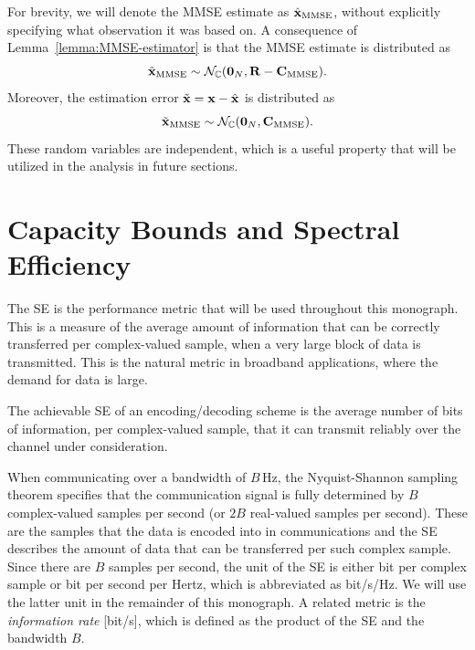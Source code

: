 For brevity, we will denote the MMSE estimate as $\hat{\mathbf{x}}_{\mathrm{MMSE}}$, without explicitly specifying what observation it was based on.
A consequence of Lemma~\ref{lemma:MMSE-estimator} is that the MMSE estimate is distributed as
\begin{equation}
\hat{\mathbf{x}}_{\mathrm{MMSE}} \sim \mathcal{N}_{\mathbb{C}} ( \mathbf{0}_N , \mathbf{R} - \mathbf{C}_{\mathrm{MMSE}}).
\end{equation}
Moreover, the estimation error $\tilde{\mathbf{x}} = \mathbf{x} - \hat{\mathbf{x}}$ is distributed as 
\begin{equation}
\tilde{\mathbf{x}}_{\mathrm{MMSE}} \sim \mathcal{N}_{\mathbb{C}} ( \mathbf{0}_N ,  \mathbf{C}_{\mathrm{MMSE}}).
\end{equation}
These random variables are independent, which is a useful property that will be utilized in the analysis in future sections.



\section{Capacity Bounds and Spectral Efficiency}
\label{sec:capacity-bounds}

The SE is the performance metric that will be used throughout this monograph.
This is a measure of the average amount of information that can be correctly transferred per complex-valued sample, when a very large block of data is transmitted. This is the natural metric in broadband applications, where the demand for data is large.

\begin{definition}\label{definition_spectral_efficiency} 
The achievable SE of an encoding/decoding scheme is the average number of bits of information, per complex-valued sample, that it can transmit reliably over the channel under consideration.
\end{definition}

When communicating over a bandwidth of $B$\,Hz, the Nyquist-Shannon sampling theorem specifies that the communication signal is fully determined by $B$ complex-valued samples per second \cite{Shannon1949b} (or $2B$ real-valued samples per second). These are the samples that the data is encoded into in communications and the SE describes the amount of data that can be transferred per such complex sample. Since there are $B$ samples per second, the unit of the SE is either bit per complex sample or bit per second per Hertz, which is abbreviated as bit/s/Hz.
We will use the latter unit in the remainder of this monograph.
A related metric is the \emph{information rate} [bit/s], which is defined as the product of the SE and the bandwidth $B$.

